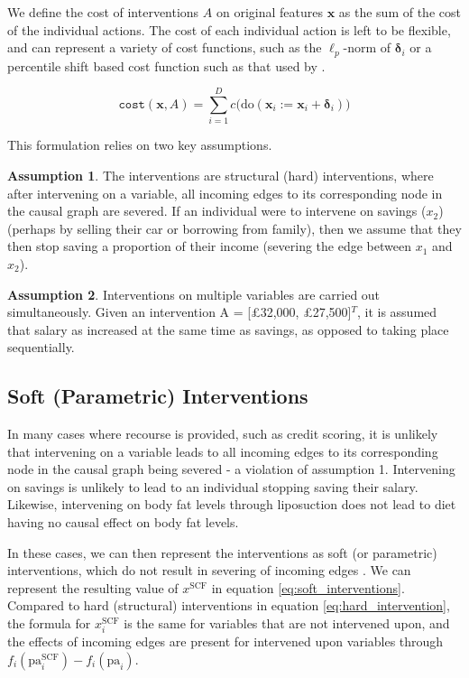 We define the cost of interventions $A$ on original features $\mathbf{x}$ as the sum of the cost of the individual actions. The cost of each individual action is left to be flexible, and can represent a variety of cost functions, such as the $\ell_p$-norm of $\boldsymbol{\delta}_i$ or a percentile shift based cost function such as that used by \textcite{ustunActionableRecourseLinear2019}.

\begin{equation}
	\texttt{cost}(\mathbf{x}, A) = \sum_{i=1}^{D} c \bigg(\text{do}(\mathbf{x}_i:=\mathbf{x}_i + \boldsymbol{\delta}_i) \bigg)
\end{equation}

This formulation relies on two key assumptions.

\textbf{Assumption 1}. The interventions are structural (hard) interventions, where after intervening on a variable, all incoming edges to its corresponding node in the causal graph are severed. If an individual were to intervene on savings ($x_2$) (perhaps by selling their car or borrowing from family), then we assume that they then stop saving a proportion of their income (severing the edge between $x_1$ and $x_2$).

\textbf{Assumption 2}. Interventions on multiple variables are carried out simultaneously. Given an intervention A = [£32,000, £27,500]$^T$, it is assumed that salary as increased at the same time as savings, as opposed to taking place sequentially.

\subsection{Soft (Parametric) Interventions}

In many cases where recourse is provided, such as credit scoring, it is unlikely that intervening on a variable leads to all incoming edges to its corresponding node in the causal graph being severed - a violation of assumption 1. Intervening on savings is unlikely to lead to an individual stopping saving their salary. Likewise, intervening on body fat levels through liposuction does not lead to diet having no causal effect on body fat levels. 

In these cases, we can then represent the interventions as soft (or parametric) interventions, which do not result in severing of incoming edges \citep{eberhardtInterventionsCausalInference2007}. We can represent the resulting value of $x^{\text{SCF}}$ in equation \ref{eq:soft_interventions}. Compared to hard (structural) interventions in equation \ref{eq:hard_intervention}, the formula for $x_i^{\text{SCF}}$ is the same for variables that are not intervened upon, and the effects of incoming edges are present for intervened upon variables through $f_i(\text{pa}^{\text{SCF}}_i) - f_i(\text{pa}_i)$.

